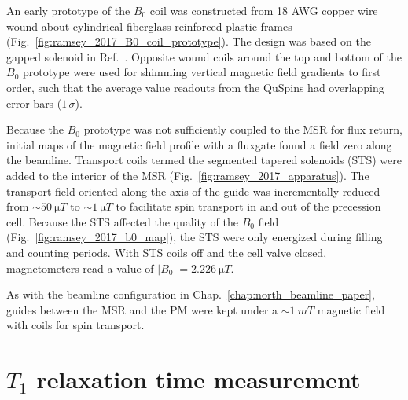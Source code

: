 An early prototype of the $B_0$ coil was constructed from 18 AWG copper wire wound about cylindrical fiberglass-reinforced plastic frames (Fig.~\ref{fig:ramsey_2017_B0_coil_prototype}). The design was based on the gapped solenoid in Ref.~\cite{gosling_gapped_solenoid_1974}. Opposite wound coils around the top and bottom of the $B_0$ prototype were used for shimming vertical magnetic field gradients to first order, such that the average value readouts from the QuSpins had overlapping error bars ($1\,\sigma$).

Because the $B_0$ prototype was not sufficiently coupled to the MSR for flux return, initial maps of the magnetic field profile with a fluxgate found a field zero along the \ucn beamline. Transport coils termed the segmented tapered solenoids (STS) were added to the interior of the MSR (Fig.~\ref{fig:ramsey_2017_apparatus}). The transport field oriented along the axis of the \ucn guide was incrementally reduced from $\sim\qty{50}{\micro T}$ to $\sim\qty{1}{\micro T}$ to facilitate spin transport in and out of the precession cell. Because the STS affected the quality of the $B_0$ field (Fig.~\ref{fig:ramsey_2017_b0_map}), the STS were only energized during filling and counting periods. With STS coils off and the cell valve closed, magnetometers read a value of $|B_0|=\qty{2.226}{\micro T}$.

As with the beamline configuration in Chap.~\ref{chap:north_beamline_paper}, guides between the MSR and the PM were kept under a $\sim\qty{1}{mT}$ magnetic field with coils for spin transport.


\section
{
    \texorpdfstring{$T_1$ relaxation time measurement}
                    {T1 relaxation time measurement}
}\label{sec:2017_t1_measurement}



